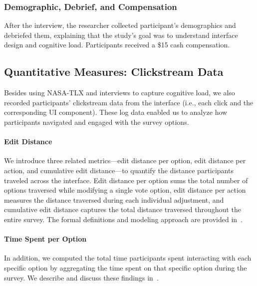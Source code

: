 \subsubsection{Demographic, Debrief, and Compensation}
After the interview, the researcher collected participant's demographics and debriefed them, explaining that the study's goal was to understand interface design and cognitive load. Participants received a \$15 cash compensation.

\subsection{Quantitative Measures: Clickstream Data}
\label{subsec:measures}

Besides using NASA-TLX and interviews to capture cognitive load, we also recorded participants' clickstream data from the interface (i.e., each click and the corresponding UI component). These log data enabled us to analyze how participants navigated and engaged with the survey options.

\paragraph{Edit Distance} We introduce three related metrics---edit distance per option, edit distance per action, and cumulative edit distance---to quantify the distance participants traveled across the interface. Edit distance per option sums the total number of options traversed while modifying a single vote option, edit distance per action measures the distance traversed during each individual adjustment, and cumulative edit distance captures the total distance traversed throughout the entire survey. The formal definitions and modeling approach are provided in~.

\paragraph{Time Spent per Option} In addition, we computed the total time participants spent interacting with each specific option by aggregating the time spent on that specific option during the survey. We describe and discuss these findings in~.